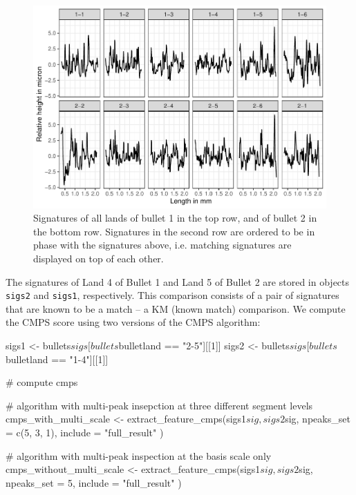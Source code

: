 \begin{Schunk}
\begin{figure}

{\centering \includegraphics[width=\textwidth]{ju-hofmann_files/figure-latex/sigs-1} 

}

\caption[Signatures of all lands of bullet 1 in the top row, and of bullet 2 in the bottom row]{Signatures of all lands of bullet 1 in the top row, and of bullet 2 in the bottom row. Signatures in the second row are ordered to be in phase with the signatures above, i.e. matching signatures are displayed on top of each other.}\label{fig:sigs}
\end{figure}
\end{Schunk}

The signatures of Land 4 of Bullet 1 and Land 5 of Bullet 2 are stored
in objects \texttt{sigs2} and \texttt{sigs1}, respectively. This
comparison consists of a pair of signatures that are known to be a match
-- a KM (known match) comparison. We compute the CMPS score using two
versions of the CMPS algorithm:

\begin{Schunk}
\begin{Sinput}
sigs1 <- bullets$sigs[bullets$bulletland == "2-5"][[1]]
sigs2 <- bullets$sigs[bullets$bulletland == "1-4"][[1]]

# compute cmps

# algorithm with multi-peak insepction at three different segment levels
cmps_with_multi_scale <-
  extract_feature_cmps(sigs1$sig, sigs2$sig,
    npeaks_set = c(5, 3, 1), include = "full_result"
  )

# algorithm with multi-peak inspection at the basis scale only
cmps_without_multi_scale <-
  extract_feature_cmps(sigs1$sig, sigs2$sig,
    npeaks_set = 5, include = "full_result"
  )
\end{Sinput}
\end{Schunk}


